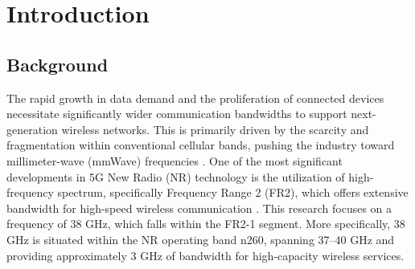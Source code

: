 \chapter{Introduction}

\section{Background}



The rapid growth in data demand and the proliferation of connected devices necessitate significantly wider communication bandwidths to support next-generation wireless networks. This is primarily driven by the scarcity and fragmentation within conventional cellular bands, pushing the industry toward millimeter-wave (mmWave) frequencies \cite{Rappaport2013}. One of the most significant developments in 5G New Radio (NR) technology is the utilization of high-frequency spectrum, specifically Frequency Range 2 (FR2), which offers extensive bandwidth for high-speed wireless communication \cite{TSGR2021}. This research focuses on a frequency of 38 GHz, which falls within the FR2-1 segment. More specifically, 38 GHz is situated within the NR operating band n260, spanning 37–40 GHz and providing approximately 3 GHz of bandwidth for high-capacity wireless services.

